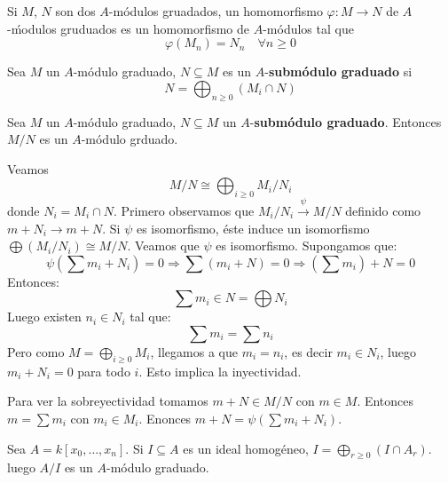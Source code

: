 \documentclass[ACGA.tex]{subfiles}
\begin{document}
\begin{defi}
Si $M$, $N$ son dos $A$-módulos gruadados, un homomorfismo $φ : M \to N$ de $A$-ḿodulos gruduados es un homomorfismo de $A$-módulos tal que
\[ φ(M_n) = N_n \quad \forall n ≥ 0 \]
\end{defi}

\begin{defi}
Sea $M$ un $A$-módulo graduado, $N \subseteq M$ es un $A$-\textbf{submódulo graduado} si
\[ N = \bigoplus_{n≥0} (M_i \cap N) \]
\end{defi}

\begin{teorema}
Sea $M$ un $A$-módulo graduado, $N \subseteq M$ un $A$-\textbf{submódulo graduado}. Entonces $M/N$ es un $A$-módulo grduado. 
\end{teorema}
\begin{dem}
Veamos
\[ M/N \cong \bigoplus_{i≥0} M_i / N_i \]
donde $N_i = M_i \cap N$. Primero observamos que $M_i/N_i \xrightarrow{ψ} M/N$ definido como $m + N_i \to m+N$. Si $ψ$ es isomorfismo, éste induce un isomorfismo $\bigoplus (M_i/N_i) \cong M/N$. Veamos que $ψ$ es isomorfismo. Supongamos que:
\[ ψ\left(\sum m_i + N_i\right) = 0 \Rightarrow  \sum \left(m_i + N\right) = 0 \Rightarrow  \left(\sum m_i\right) + N = 0\]
Entonces:
\[ \sum m_i \in N = \bigoplus N_i \]
Luego existen $n_i \in N_i$ tal que:
\[ \sum m_i = \sum n_i\]
Pero como $M = \bigoplus_{i≥0} M_i$, llegamos a que $m_i = n_i$, es decir $m_i \in N_i$, luego $m_i + N_i = 0$ para todo $i$. Esto implica la inyectividad.

Para ver la sobreyectividad tomamos $m+N \in M/N$ con $m \in M$. Entonces $m = \sum m_i$ con $m_i \in M_i$. Enonces $m+N = ψ\left(\sum m_i + N_i\right)$.
\end{dem}

\begin{ej}
Sea $A = k[x_0,\dots,x_n]$. Si $I \subseteq A$ es un ideal homogéneo, $I = \bigoplus_{r≥0} \left(I \cap A_r\right)$. luego $A/I$ es un $A$-módulo graduado.
\end{ej}
\end{document}
